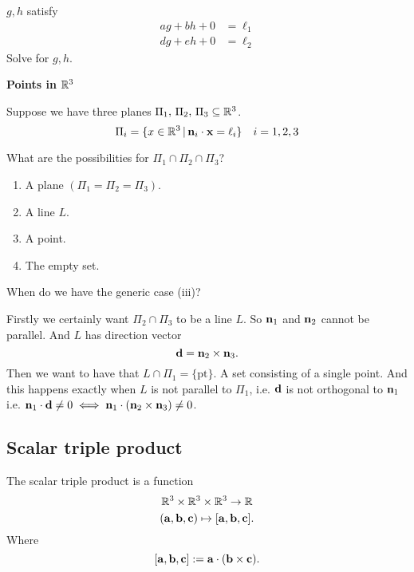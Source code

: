 \documentclass[10pt, a4paper]{article}
\begin{document}
$g, h$ satisfy
\begin{align*}
    ag + bh + 0 &= \ell_1 \\
    dg + eh + 0 &= \ell_2
\end{align*}
Solve for $g, h$.

\textbf{Points in} $\mathbb{R} ^ 3$

Suppose we have three planes
$\Pi_1,\,\Pi_2,\,\Pi_3 \subseteq \mathbb{R} ^ 3$.
\[
\Pi_i = \{x \in \mathbb{R} ^ 3 \, | \, \mathbf{n}_i \cdot \mathbf{x} = \ell_i\}\quad i = 1, 2, 3
\]

What are the possibilities for $\Pi_1 \cap \Pi_2 \cap \Pi_3$?
\begin{enumerate}[label = (\roman*)]
    \item A plane $(\Pi_1 = \Pi_2 = \Pi_3)$.
    \item A line $L$.
    \item A point.
    \item The empty set.
\end{enumerate}

When do we have the generic case (iii)?

Firstly we certainly want $\Pi_2 \cap \Pi_3$ to be a line $L$. So $\mathbf{n}_1$ and $\mathbf{n}_2$ cannot be parallel. And $L$ has direction vector
\[
\mathbf{d} = \mathbf{n}_2 \times \mathbf{n}_3.
\]
Then we want to have that $L \cap \Pi_1 = \{\text{pt}\}.$ A set consisting of a single point. And this happens exactly when $L$ is not parallel to $\Pi_1$, i.e. $\mathbf{d}$ is not orthogonal to $\mathbf{n}_1$ i.e. $\mathbf{n}_1 \cdot \mathbf{d} \neq 0 \iff \mathbf{n}_1 \cdot (\mathbf{n}_2 \times \mathbf{n}_3) \neq 0$.

\subsection{Scalar triple product}

\begin{definition}
    The scalar triple product is a function
    \[
    \mathbb{R} ^ 3 \times \mathbb{R} ^ 3 \times \mathbb{R} ^ 3 \rightarrow \mathbb{R}
    \]
    \[
    (\mathbf{a}, \mathbf{b}, \mathbf{c}) \mapsto [\mathbf{a}, \mathbf{b}, \mathbf{c}].
    \]
    Where
    \[
    [\mathbf{a}, \mathbf{b}, \mathbf{c}] := \mathbf{a} \cdot (\mathbf{b} \times \mathbf{c}).
    \]
\end{definition}
\end{document}

